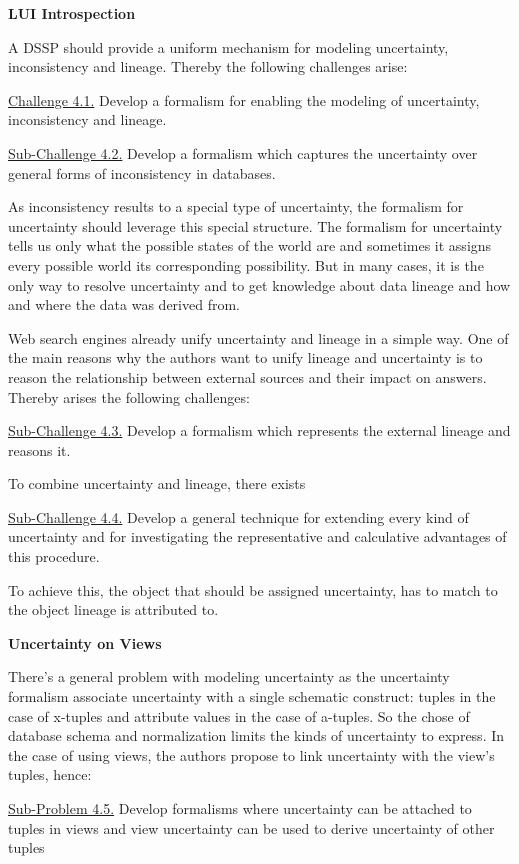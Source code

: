 \textbf{LUI Introspection}

A DSSP should provide a uniform mechanism for modeling uncertainty, inconsistency and lineage. Thereby the following challenges arise:

\uline{Challenge 4.1.}  Develop a formalism for enabling the modeling of uncertainty, inconsistency and lineage.

\uline{Sub-Challenge 4.2.}  Develop a formalism which captures the uncertainty over general forms of inconsistency in databases.

As inconsistency results to a special type of uncertainty, the formalism for uncertainty should leverage this special structure. The formalism for uncertainty tells us only what the possible states of the world are and sometimes it assigns every possible world its corresponding possibility. But in many cases, it is the only way to resolve uncertainty and to get knowledge about data lineage and how and where the data was derived from.

Web search engines already unify uncertainty and lineage in a simple way. One of the main reasons why the authors want to unify lineage and uncertainty is to reason the relationship between external sources and their impact on answers. Thereby arises the following challenges:

\uline{Sub-Challenge 4.3.}  Develop a formalism which represents the external lineage and reasons it.

To combine uncertainty and lineage, there exists

\uline{Sub-Challenge 4.4.}  Develop a general technique for extending every kind of uncertainty and for investigating the representative and calculative advantages of this procedure. 

To achieve this, the object that should be assigned uncertainty, has to match to the object lineage is attributed to. 

\textbf{Uncertainty on Views}

There's a general problem with modeling uncertainty as the uncertainty formalism associate uncertainty with a single schematic construct: tuples in the case of x-tuples and attribute values in the case of a-tuples. So the chose of database schema and normalization limits the kinds of uncertainty to express. In the case of using views, the authors propose to link uncertainty with the view's tuples, hence:

\uline{Sub-Problem 4.5.} Develop formalisms where uncertainty can be attached to tuples in views and view uncertainty can be used to derive uncertainty of other tuples

